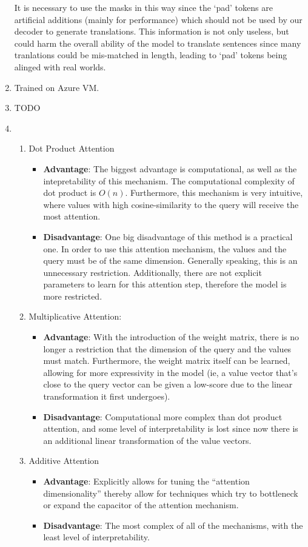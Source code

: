 \documentclass[12pt]{article}
\begin{document}
\begin{enumerate}[label=(\alph*)]
    It is necessary to use the masks in this way since the `pad' tokens are artificial additions (mainly for performance) which should not be used by our decoder to generate translations. This information is not only useless, but could harm the overall ability of the model to translate sentences since many tranlations could be mis-matched in length, leading to `pad' tokens being alinged with real worlds.
  \item
    Trained on Azure VM.
  \item TODO
  \item
    \begin{enumerate}[label=\roman*]
      \item Dot Product Attention
        \begin{itemize}
          \item \textbf{Advantage}: The biggest advantage is computational, as well as the intepretability of this mechanism. The computational complexity of dot product is $O(n)$. Furthermore, this mechanism is very intuitive, where values with high cosine-similarity to the query will receive the most attention.
          \item \textbf{Disadvantage}: One big disadvantage of this method is a practical one. In order to use this attention mechanism, the values and the query must be of the same dimension. Generally speaking, this is an unnecessary restriction. Additionally, there are not explicit parameters to learn for this attention step, therefore the model is more restricted.
        \end{itemize}
      \item Multiplicative Attention:
        \begin{itemize}
          \item \textbf{Advantage}: With the introduction of the weight matrix, there is no longer a restriction that the dimension of the query and the values must match. Furthermore, the weight matrix itself can be learned, allowing for more expressivity in the model (ie, a value vector that's close to the query vector can be given a low-score due to the linear transformation it first undergoes).
          \item \textbf{Disadvantage}: Computational more complex than dot product attention, and some level of interpretability is lost since now there is an additional linear transformation of the value vectors.
        \end{itemize}
      \item Additive Attention
        \begin{itemize}
          \item \textbf{Advantage}: Explicitly allows for tuning the ``attention dimensionality'' thereby allow for techniques which try to bottleneck or expand the capacitor of the attention mechanism.
          \item \textbf{Disadvantage}: The most complex of all of the mechanisms, with the least level of interpretability.
        \end{itemize}
    \end{enumerate}
\end{enumerate}
\end{document}
